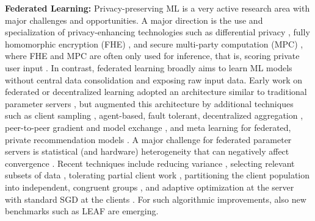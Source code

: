 \documentclass[sigconf,screen]{acmart}
\begin{document}
\textbf{Federated Learning:} Privacy-preserving ML is a very active research area with major challenges and opportunities. A major direction is the use and specialization of privacy-enhancing technologies such as differential privacy \cite{JiLE14}, fully homomorphic encryption (FHE) \cite{Gentry09,AcarAUC18,GiladBachrachD16}, and secure multi-party computation (MPC) \cite{MohasselZ17}, where FHE and MPC are often only used for inference, that is, scoring private user input \cite{GiladBachrachD16,JuvekarVC18,DathathriS0LLMM19}. In contrast, federated learning broadly aims to learn ML models without central data consolidation and exposing raw input data. Early work on federated or decentralized learning \cite{McMahanMRA16,McMahanMRHA17,LianZZHZL17,BonawitzEGHIIKK19} adopted an architecture similar to traditional parameter servers \cite{SmolaN10,DeanCMCDLMRSTYN12,LiAPSAJLSS14,JiangCZY17}, but augmented this architecture by additional techniques such as client sampling \cite{McMahanMRHA17}, agent-based, fault tolerant, decentralized aggregation \cite{BonawitzEGHIIKK19, BonawitzIKMMPRS17}, peer-to-peer gradient and model exchange \cite{WatcharapichatM16,LianZZHZL17,LianZZL18}, and meta learning for federated, private recommendation models \cite{LinRCRY0RC20,abs-2101-06927}. A major challenge for federated parameter servers is statistical (and hardware) heterogeneity \cite{LiSTS20,Smith20} that can negatively affect convergence \cite{abs-1812-01097}. Recent techniques include reducing variance \cite{TangLYZL18}, selecting relevant subsets of data \cite{tuor2020overcoming}, tolerating partial client work \cite{LiSZSTS20}, partitioning the client population into independent, congruent groups \cite{abs-1910-01991}, and adaptive optimization at the server with standard SGD at the clients \cite{abs-2003-00295}. For such algorithmic improvements, also new benchmarks such as LEAF \cite{abs-1812-01097} are emerging.
\end{document}
